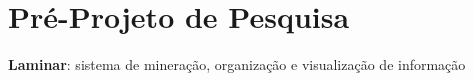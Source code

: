 




\pretextual{} %


\textual{} %

\chapter{Pré-Projeto de Pesquisa}

\textbf{Laminar}: sistema de mineração, organização e visualização de informação

